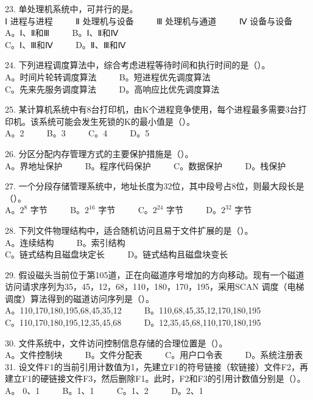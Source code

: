 23. 单处理机系统中，可并行的是。 \\
Ⅰ 进程与进程 $\qquad$ Ⅱ 处理机与设备 $\qquad$ Ⅲ 处理机与通道  $\qquad$ Ⅳ 设备与设备 \\
A。Ⅰ、Ⅱ和Ⅲ $\qquad$ B。Ⅰ、Ⅱ和Ⅳ \\
C。Ⅰ、Ⅲ和Ⅳ $\qquad$ D。Ⅱ、Ⅲ和Ⅳ

24. 下列进程调度算法中，综合考虑进程等待时间和执行时间的是（）。 \\
A。时间片轮转调度算法 $\qquad$ B。短进程优先调度算法 \\
C。先来先服务调度算法 $\qquad$ D。高响应比优先调度算法

25. 某计算机系统中有8台打印机，由K个进程竞争使用，每个进程最多需要3台打印机。该系统可能会发生死锁的K的最小值是（）。 \\
A。2 $\qquad$ B。3 $\qquad$ C。4 $\qquad$ D。5

26. 分区分配内存管理方式的主要保护措施是（）。 \\
A。界地址保护 $\qquad$ B。程序代码保护 $\qquad$ C。数据保护 $\qquad$ D。栈保护

27. 一个分段存储管理系统中，地址长度为32位，其中段号占8位，则最大段长是（）。 \\
A。$2^8$ 字节 $\qquad$ B。$2^{16}$ 字节 $\qquad$ C。$2^{24}$ 字节 $\qquad$ D。$2^{32}$ 字节

28. 下列文件物理结构中，适合随机访问且易于文件扩展的是（）。 \\
A。连续结构 $\qquad$ B。索引结构 \\
C。链式结构且磁盘块定长 $\qquad$ D。链式结构且磁盘块变长

29. 假设磁头当前位于第105道，正在向磁道序号增加的方向移动。现有一个磁道访问请求序列为35，45，12，68，110，180，170，195，采用SCAN 调度（电梯调度）算法得到的磁道访问序列是（）。 \\
A。110,170,180,195,68,45,35,12 $\qquad$ B。110,68,45,35,12,170,180,195 \\
C。110,170,180,195,12,35,45,68 $\qquad$ D。12,35,45,68,110,170,180,195

30. 文件系统中，文件访问控制信息存储的合理位置是（）。 \\
A。文件控制块 $\qquad$ B。文件分配表 $\qquad$ C。用户口令表 $\qquad$ D。系统注册表 \\

31. 设文件F1的当前引用计数值为1，先建立F1的符号链接（软链接）文件F2，再建立F1的硬链接文件F3，然后删除F1。此时，F2和F3的引用计数值分别是（）。 \\
A。 0、1 $\qquad$ B。1、1 $\qquad$ C。1、2 $\qquad$ D。2、1

